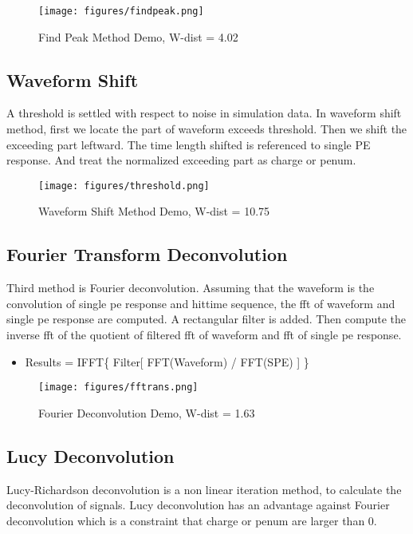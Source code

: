 \begin{figure}[H]
    \centering
    \caption{Find Peak Method Demo, W-dist = 4.02}
    \texttt{[image: figures/findpeak.png]}
\end{figure}

\subsection{Waveform Shift}
A threshold is settled with respect to noise in simulation data. In waveform shift method, first we locate the part of waveform exceeds threshold. Then we shift the exceeding part leftward. The time length shifted is referenced to single PE response. And treat the normalized exceeding part as charge or penum. 

\begin{figure}[H]
    \centering
    \caption{Waveform Shift Method Demo, W-dist = 10.75}
    \texttt{[image: figures/threshold.png]}
\end{figure}

\subsection{Fourier Transform Deconvolution}
Third method is Fourier deconvolution. Assuming that the waveform is the convolution of single pe response and hittime sequence, the fft of waveform and single pe response are computed. A rectangular filter is added. Then compute the inverse fft of the quotient of filtered fft of waveform and fft of single pe response. 

\begin{itemize}
    \item Results = IFFT\{ Filter[ FFT(Waveform) / FFT(SPE) ] \}
\end{itemize}

\begin{figure}[H]
    \centering
    \caption{Fourier Deconvolution Demo, W-dist = 1.63}
    \texttt{[image: figures/fftrans.png]}
\end{figure}

\subsection{Lucy Deconvolution}
Lucy-Richardson deconvolution is a non linear iteration method, to calculate the deconvolution of signals. Lucy deconvolution has an advantage against Fourier deconvolution which is a constraint that charge or penum are larger than 0. 



